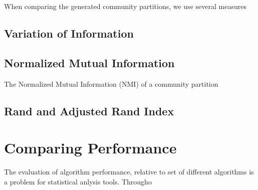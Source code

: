 When comparing the generated community partitions, we use several measures

\subsection{Variation of Information}
\cite{Marina2007}

\subsection{Normalized Mutual Information}
The Normalized Mutual Information (NMI) of a community partition 

\subsection{Rand and Adjusted Rand Index}
\cite{rand1971}


\section{Comparing Performance}

The evaluation of algorithm performance, relative to set of different algorithms is a problem for statistical anlysis tools. Througho
